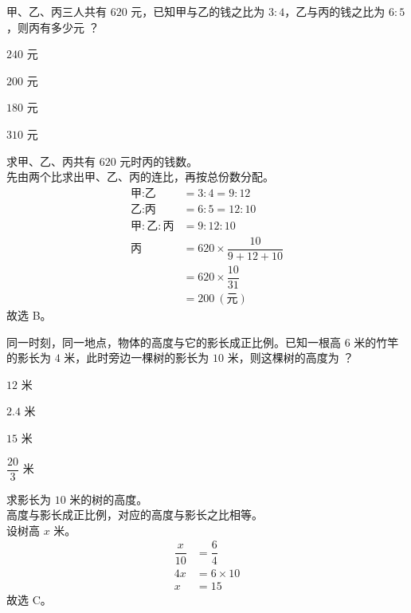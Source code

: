 \documentclass[12pt,a4paper,fontset=none]{exam-zh}
\begin{document}
\begin{question}
    甲、乙、丙三人共有 $620$ 元，已知甲与乙的钱之比为 $3:4$，乙与丙的钱之比为 $6:5$，则丙有多少元 \paren[B]？
    \begin{choices}
        \item $240$ 元
        \item $200$ 元
        \item $180$ 元
        \item $310$ 元
    \end{choices}
\end{question}

\begin{solution}
    求甲、乙、丙共有 $620$ 元时丙的钱数。 \\
    先由两个比求出甲、乙、丙的连比，再按总份数分配。
    \begin{align*}
        \text{甲}:\text{乙} &= 3:4 = 9:12 \\
        \text{乙}:\text{丙} &= 6:5 = 12:10 \\
        \text{甲}:\text{乙}:\text{丙} &= 9:12:10 \\
        \text{丙} &= 620\times\dfrac{10}{9+12+10} \\
        &= 620\times\dfrac{10}{31} \\
        &= 200\ (\text{元})
    \end{align*}
    故选 B。
\end{solution}

\begin{question}
    同一时刻，同一地点，物体的高度与它的影长成正比例。已知一根高 $6$ 米的竹竿的影长为 $4$ 米，此时旁边一棵树的影长为 $10$ 米，则这棵树的高度为 \paren[C]？
    \begin{choices}
        \item $12$ 米
        \item $2.4$ 米
        \item $15$ 米
        \item $\dfrac{20}{3}$ 米
    \end{choices}
\end{question}

\begin{solution}
    求影长为 $10$ 米的树的高度。 \\
    高度与影长成正比例，对应的高度与影长之比相等。 \\
    设树高 $x$ 米。
    \begin{align*}
        \dfrac{x}{10} &= \dfrac{6}{4} \\
        4x &= 6\times 10 \\
        x &= 15
    \end{align*}
    故选 C。
\end{solution}
\end{document}
